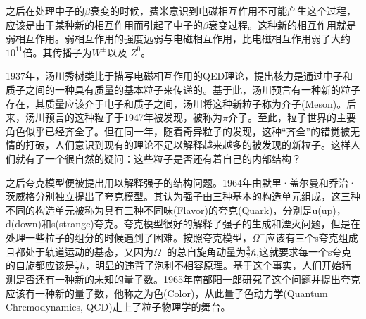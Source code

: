 之后在处理中子的$\beta$衰变的时候，费米意识到电磁相互作用不可能产生这个过程，应该是由于某种新的相互作用而引起了中子的$\beta$衰变过程。这种新的相互作用就是弱相互作用。弱相互作用的强度远弱与电磁相互作用，比电磁相互作用弱了大约$10^{11}$倍。其传播子为$W^{\pm}$以及 $Z^0$。

1937年，汤川秀树类比于描写电磁相互作用的QED理论，提出核力是通过中子和质子之间的一种具有质量的基本粒子来传递的。基于此，汤川预言有一种新的粒子存在，其质量应该介于电子和质子之间，汤川将这种新粒子称为介子(Meson)。后来，汤川预言的这种粒子于1947年被发现，被称为$\pi$介子。至此，粒子世界的主要角色似乎已经齐全了。但在同一年，随着奇异粒子的发现，这种“齐全”的错觉被无情的打破，人们意识到现有的理论不足以解释越来越多的被发现的新粒子。这样人们就有了一个很自然的疑问：这些粒子是否还有着自己的内部结构？

之后夸克模型便被提出用以解释强子的结构问题。1964年由默里·盖尔曼和乔治·茨威格分别独立提出了夸克模型。其认为强子由三种基本的构造单元组成，这三种不同的构造单元被称为具有三种不同味(Flavor)的夸克(Quark)，分别是u(up)，d(down)和s(strange)夸克。夸克模型很好的解释了强子的生成和湮灭问题，但是在处理一些粒子的组分的时候遇到了困难。按照夸克模型，$\Omega^-$应该有三个s夸克组成且都处于轨道运动的基态，又因为$\Omega^-$的总自旋角动量为$\frac{3}{2}\hbar$,这就要求每一个s夸克的自旋都应该是$\frac{1}{2}\hbar$，明显的违背了泡利不相容原理。基于这个事实，人们开始猜测是否还有一种新的未知的量子数。1965年南部阳一郎研究了这个问题并提出夸克应该有一种新的量子数，他称之为色(Color)，从此量子色动力学(Quantum Chremodynamics, QCD)走上了粒子物理学的舞台。

